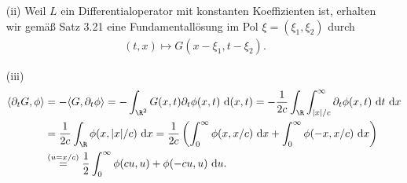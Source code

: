 \begin{solution}
\begin{itemize}
\item[(ii)] Weil $L$ ein Differentialoperator mit konstanten Koeffizienten ist, erhalten wir gemäß Satz 3.21 eine Fundamentallösung im Pol $\xi = (\xi_1, \xi_2)$ durch
\begin{align*}
(t, x) \mapsto G(x - \xi_1, t - \xi_2).
\end{align*}

\item[(iii)]
\begin{align*}
    \langle \partial_t G, \phi \rangle &= - \langle G, \partial_t \phi \rangle =
    - \int_{\R^2} G(x, t) \partial_t \phi(x, t) \mathrm{~d}(x, t) =
    - \frac{1}{2c} \int_\R \int_{|x|/c}^\infty \partial_t \phi(x, t)    \mathrm{~d}t \mathrm{~d}x \\
    &= \frac{1}{2c} \int_\R \phi(x, |x|/c) \mathrm{~d}x =
    \frac{1}{2c} \left( \int_0^\infty \phi(x, x/c) \mathrm{~d}x + \int_0^\infty \phi(-x, x/c) \mathrm{~d}x \right)  \\
    &\stackrel{(u = x/c)}{~=~} \frac{1}{2} \int_0^\infty \phi(cu, u) + \phi(-cu, u) \mathrm{~d}u.
\end{align*}

\end{itemize}

\end{solution}


